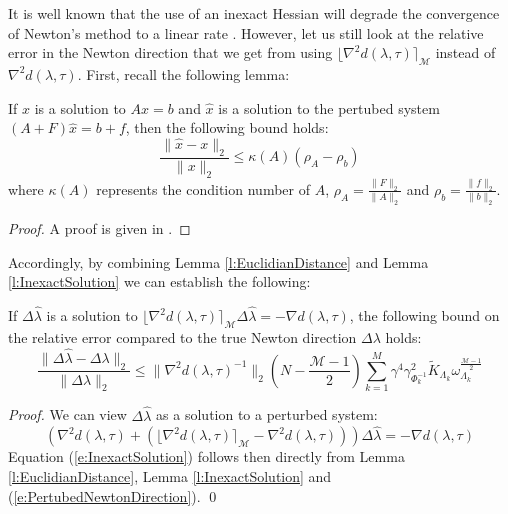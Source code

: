 It is well known that the use of an inexact Hessian will degrade the convergence of Newton's method to a linear rate \cite{}. However, let us still look at the relative error in the Newton direction that we get from using $\lfloor \nabla^2 d(\lambda, \tau) \rceil_{\mathcal{M}}$ instead of $\nabla^2 d(\lambda, \tau)$. First, recall the following lemma:
\begin{lemma} \label{l:InexactSolution}
If $x$ is a solution to $Ax = b$ and $\hat{x}$ is a solution to the pertubed system $(A + F) \hat{x} = b + f$, then the following bound holds:
\begin{equation}
\frac{\| \hat{x} - x \|_2}{\| x \|_2} \leq \kappa (A) (\rho_A - \rho_b)
\end{equation}
where $\kappa (A)$ represents the condition number of $A$, $\rho_A = \frac{\| F \|_2}{\| A \|_2}$ and $\rho_b = \frac{\| f \|_2}{\| b \|_2}$.
\end{lemma}
\begin{proof}
A proof is given in \cite{}.
\end{proof}

Accordingly, by combining Lemma \ref{l:EuclidianDistance} and Lemma \ref{l:InexactSolution} we can establish the following:
\begin{lemma}
If $\Delta \hat{\lambda}$ is a solution to $\lfloor \nabla^2 d(\lambda, \tau) \rceil_{\mathcal{M}} \Delta \hat{\lambda} = -\nabla d(\lambda,\tau)$, the following bound on the relative error compared to the true Newton direction $\Delta \lambda$ holds:
\begin{equation} \label{e:InexactSolution}
\frac{\| \Delta \hat{\lambda} - \Delta \lambda \|_2}{\| \Delta \lambda \|_2} \leq \| \nabla^2 d(\lambda,\tau)^{-1} \|_2 (N -\frac{\mathcal{M} - 1}{2}) \sum_{k=1}^M \gamma^4 \gamma_{\Phi_k^{-1}}^2 \tilde{K}_{\Lambda_k} \omega_{\Lambda_k}^{\frac{\mathcal{M} - 1}{2}}
\end{equation}
\end{lemma}
\begin{proof}
We can view $\Delta \hat{\lambda}$ as a solution to a perturbed system:
\begin{equation}
\label{e:PertubedNewtonDirection}
\left( \nabla^2 d(\lambda, \tau) + (\lfloor \nabla^2 d(\lambda, \tau) \rceil_{\mathcal{M}} - \nabla^2 d(\lambda, \tau)) \right) \Delta \hat{\lambda} = -\nabla d(\lambda, \tau)
\end{equation}
Equation (\ref{e:InexactSolution}) follows then directly from Lemma \ref{l:EuclidianDistance}, Lemma \ref{l:InexactSolution} and (\ref{e:PertubedNewtonDirection}).
\qed
\end{proof}

